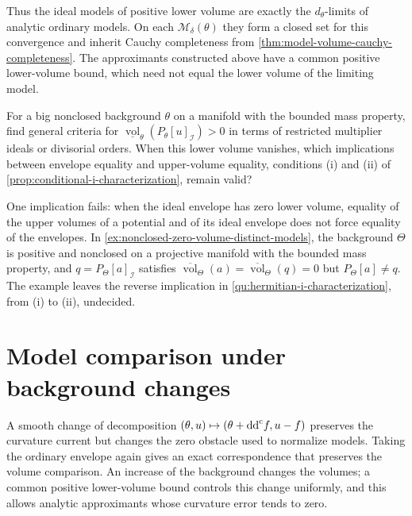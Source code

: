 Thus the ideal models of positive lower volume are exactly the $d_\theta$-limits of analytic ordinary models. On each $\mathcal M_\delta(\theta)$ they form a closed set for this convergence and inherit Cauchy completeness from \cref{thm:model-volume-cauchy-completeness}. The approximants constructed above have a common positive lower-volume bound, which need not equal the lower volume of the limiting model.



\begin{problem}\label{qu:hermitian-i-characterization}
For a big nonclosed background $\theta$ on a manifold with the bounded mass property, find general criteria for $\underline{\operatorname{vol}}_\theta(P_\theta[u]_{\mathcal I})>0$ in terms of restricted multiplier ideals or divisorial orders. When this lower volume vanishes, which implications between envelope equality and upper-volume equality, conditions (i) and (ii) of \cref{prop:conditional-i-characterization}, remain valid?
\end{problem}

One implication fails: when the ideal envelope has zero lower volume, equality of the upper volumes of a potential and of its ideal envelope does not force equality of the envelopes. In \cref{ex:nonclosed-zero-volume-distinct-models}, the background $\Theta$ is positive and nonclosed on a projective manifold with the bounded mass property, and $q=P_\Theta[a]_{\mathcal I}$ satisfies $\overline{\operatorname{vol}}_\Theta(a)=\overline{\operatorname{vol}}_\Theta(q)=0$ but $P_\Theta[a]\ne q$. The example leaves the reverse implication in \cref{qu:hermitian-i-characterization}, from (i) to (ii), undecided.



\section{Model comparison under background changes}
\label{sec:model-background-comparison}

A smooth change of decomposition $(\theta,u)\mapsto(\theta+\mathrm{dd}^{\mathrm{c}} f,u-f)$ preserves the curvature current but changes the zero obstacle used to normalize models. Taking the ordinary envelope again gives an exact correspondence that preserves the volume comparison. An increase of the background changes the volumes; a common positive lower-volume bound controls this change uniformly, and this allows analytic approximants whose curvature error tends to zero.

